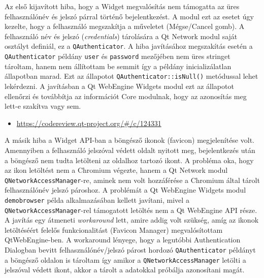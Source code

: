 \documentclass[12pt]{report}
\let\origurl\url
\renewcommand{\url}[1]{%
    \textcolor{blue}{\origurl{#1}}
}
\newcommand{\gerrit}[1]{%
    \textcolor{qtgreen}{\origurl{https://codereview.qt-project.org/\#/c/#1}}
}
\begin{document}
Az első kijavított hiba, hogy a Widget megvalósítás nem támogatta az üres felhasználónév és
jelszó párral történő bejelentkezést. A modul ezt az esetet úgy kezelte, hogy a felhasználó
megszakítja a műveletet (Mégse/Cancel gomb). A felhasználó név és jelszó
(\textit{credentials}) tárolására a Qt Network modul saját osztályt definiál, ez a
\texttt{QAuthenticator}. A hiba javításához megszakítás esetén a \texttt{QAuthenticator}
példány \texttt{user} és \texttt{password} mezőjében nem üres stringet tároltam, hanem
nem állítottam be semmit így a példány inicializálatlan állapotban marad. Ezt az állapotot
\texttt{QAuthenticator::isNull()} metódussal lehet lekérdezni. A javításban a Qt WebEngine
Widgets modul ezt az állapotot ellenőrzi és továbbítja az információt Core modulnak, hogy
az azonosítás meg lett-e szakítva vagy sem.

\begin{center}
    \begin{reviewbox}
        \begin{itemize}
            \renewcommand{\labelitemi}{\textcolor{qtgreen}{$\blacktriangleright$}}
            \item \gerrit{124331}
        \end{itemize}
    \end{reviewbox}
\end{center}

A másik hiba a Widget API-ban a böngésző ikonok (favicon) megjelenítése volt. Amennyiben a
felhasználó jelszóval védett oldalt nyitott meg, bejelentkezés után a böngésző nem tudta
letölteni az oldalhoz tartozó ikont. A probléma oka, hogy az ikon letöltést nem a Chromium
végezte, hanem a Qt Network modul \texttt{QNetworkAccessManager}-re, aminek nem volt
hozzáférése a Chromium által tárolt felhasználónév jelszó pároshoz. A problémát a
Qt WebEngine Widgets modul \texttt{demobrowser} példa alkalmazásában kellett javítani,
mivel a \texttt{QNetworkAccessManager}-rel támogatott letöltés nem a Qt WebEngine API része.
A javítás egy átmeneti \textit{workaround} lett, amire addig volt szükség, amíg az ikonok
letöltéséért felelős funkcionalitást (Favicon Manager) megvalósítottam QtWebEngine-ben.
A workaround lényege, hogy a legutóbbi Authentication Dialogban bevitt felhasználónév/jelszó
párost hordozó \texttt{QAuthenticator} példányt a böngésző oldalon is tároltam így amikor a
\texttt{QNetworkAccessManager} letölti a jelszóval védett ikont, akkor a tárolt a adatokkal
próbálja azonosítani magát.
\end{document}
